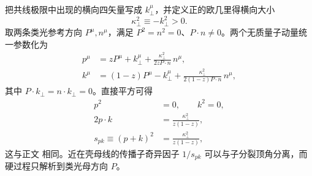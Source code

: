 \begin{derivation}[最低阶部分子分裂核]
把共线极限中出现的横向四矢量写成 $k_\perp^\mu$，并定义正的欧几里得横向大小
\begin{equation*}
 \kappa_\perp^2\equiv-k_\perp^2>0.
\end{equation*}
取两条类光参考方向 $P^\mu,n^\mu$，满足 $P^2=n^2=0$、$P\cdot n\neq0$。两个无质量子动量统一参数化为
\begin{align*}
 p^\mu
 &=zP^\mu+k_\perp^\mu
 +\frac{\kappa_\perp^2}{2zP\cdot n}\,n^\mu,\\
 k^\mu
 &=(1-z)P^\mu-k_\perp^\mu
 +\frac{\kappa_\perp^2}{2(1-z)P\cdot n}\,n^\mu,
\end{align*}
其中 $P\cdot k_\perp=n\cdot k_\perp=0$。直接平方可得
\begin{align*}
 p^2&=0,\qquad k^2=0,\\
 2p\cdot k
 &=\frac{\kappa_\perp^2}{z(1-z)},\\
 s_{pk}\equiv(p+k)^2
 &=\frac{\kappa_\perp^2}{z(1-z)},
\end{align*}
这与正文 相同。近在壳母线的传播子奇异因子 $1/s_{pk}$ 可以与子分裂顶角分离，而硬过程只解析到类光母方向 $P$。


\end{derivation}
